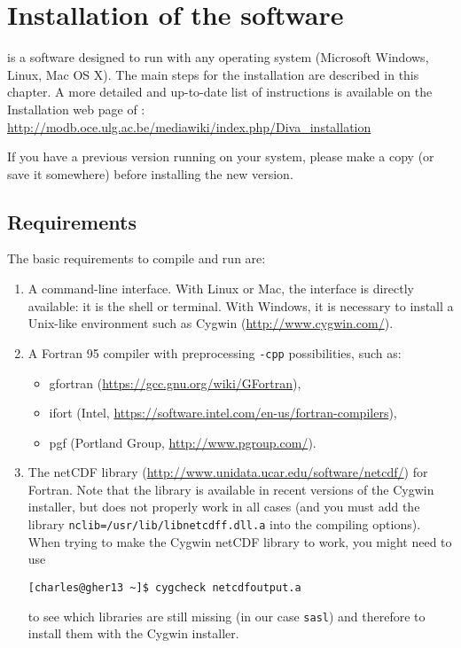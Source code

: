 \chapter{Installation of the software\label{chap:installation}}

\diva is a software designed to run with any operating system (Microsoft Windows, Linux, Mac OS X). The main steps for the installation are described in this chapter. A more detailed and up-to-date list of instructions is available on the Installation web page of \diva: \url{http://modb.oce.ulg.ac.be/mediawiki/index.php/Diva_installation}

\warning If you have a previous \diva version running on your system, please make a copy (or save it somewhere) before installing the new version.


\minitoc




\section{Requirements}

The basic requirements to compile and run \diva are:
\begin{enumerate}
\item A command-line interface. With Linux or Mac, the interface is directly available: it is the shell or terminal. With Windows, it is necessary to install a Unix-like environment such as Cygwin (\url{http://www.cygwin.com/}).
\item A Fortran 95 compiler with preprocessing \texttt{-cpp} possibilities, such as:
\begin{itemize}
\item gfortran (\url{https://gcc.gnu.org/wiki/GFortran}),
\item ifort (Intel\textsuperscript{\textregistered}, \url{https://software.intel.com/en-us/fortran-compilers}),
\item pgf (Portland Group, \url{http://www.pgroup.com/}).
\end{itemize}    
\item The netCDF library (\url{http://www.unidata.ucar.edu/software/netcdf/}) for Fortran. Note that the library is available in recent versions of the Cygwin installer, but does not properly work in all cases (and you must add the library \texttt{nclib=/usr/lib/libnetcdff.dll.a} into the compiling options). When trying to make the Cygwin netCDF library to work, you might need to use 

\begin{lstlisting}[style=Bash]
[charles@gher13 ~]$ cygcheck netcdfoutput.a
\end{lstlisting}
to see which libraries are still missing (in our case \texttt{sasl}) and therefore to install them with the Cygwin installer.  
\end{enumerate}

